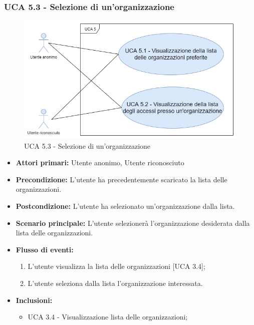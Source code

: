 \subsubsection{UCA 5.3 - Selezione di un'organizzazione}
\begin{figure}[h]
	\centering	
	\includegraphics[scale=0.5]{sezioni/UseCase/Immagini/UCA5.3.png}
	\caption{UCA 5.3 - Selezione di un'organizzazione}
\end{figure}

\begin{itemize}
    \item \textbf{Attori primari:} Utente anonimo, Utente riconosciuto
    \item \textbf{Precondizione:} L'utente ha precedentemente scaricato la lista delle organizzazioni.
    \item \textbf{Postcondizione:} L'utente ha selezionato un'organizzazione dalla lista.
    \item \textbf{Scenario principale:} L'utente selezionerà l'organizzazione desiderata dalla lista delle organizzazioni.
    \item \textbf{Flusso di eventi:}
    \begin{enumerate}
        \item L'utente visualizza la lista delle organizzazioni [UCA 3.4];
        \item L'utente seleziona dalla lista l'organizzazione interessata.
    \end{enumerate}
    \item \textbf{Inclusioni:}
    \begin{itemize}
        \item UCA 3.4 - Visualizzazione lista delle organizzazioni;
    \end{itemize}
\end{itemize}